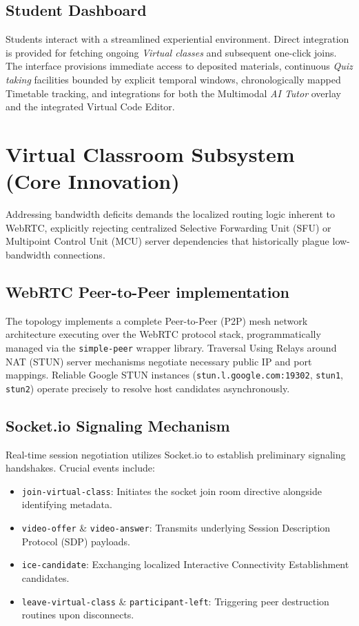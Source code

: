 \documentclass[12pt, journal, onecolumn]{IEEEtran}
\begin{document}
\subsection{Student Dashboard}
Students interact with a streamlined experiential environment. Direct integration is provided for fetching ongoing \textit{Virtual classes} and subsequent one-click joins. The interface provisions immediate access to deposited materials, continuous \textit{Quiz taking} facilities bounded by explicit temporal windows, chronologically mapped Timetable tracking, and integrations for both the Multimodal \textit{AI Tutor} overlay and the integrated Virtual Code Editor.

\section{Virtual Classroom Subsystem (Core Innovation)}
Addressing bandwidth deficits demands the localized routing logic inherent to WebRTC, explicitly rejecting centralized Selective Forwarding Unit (SFU) or Multipoint Control Unit (MCU) server dependencies that historically plague low-bandwidth connections.

\subsection{WebRTC Peer-to-Peer implementation}
The topology implements a complete Peer-to-Peer (P2P) mesh network architecture executing over the WebRTC protocol stack, programmatically managed via the \texttt{simple-peer} wrapper library. Traversal Using Relays around NAT (STUN) server mechanisms negotiate necessary public IP and port mappings. Reliable Google STUN instances (\texttt{stun.l.google.com:19302}, \texttt{stun1}, \texttt{stun2}) operate precisely to resolve host candidates asynchronously.

\subsection{Socket.io Signaling Mechanism}
Real-time session negotiation utilizes Socket.io to establish preliminary signaling handshakes. Crucial events include:
\begin{itemize}
    \item \texttt{join-virtual-class}: Initiates the socket join room directive alongside identifying metadata.
    \item \texttt{video-offer} \& \texttt{video-answer}: Transmits underlying Session Description Protocol (SDP) payloads.
    \item \texttt{ice-candidate}: Exchanging localized Interactive Connectivity Establishment candidates.
    \item \texttt{leave-virtual-class} \& \texttt{participant-left}: Triggering peer destruction routines upon disconnects.
\end{itemize}
\end{document}
